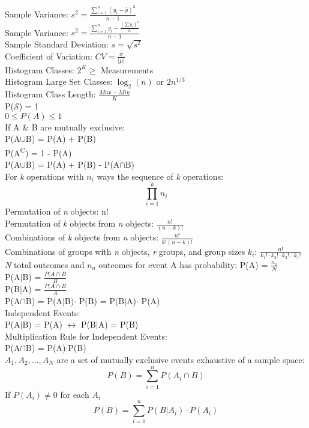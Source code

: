 \documentclass[letter, 12pt]{article}
\begin{document}
\begin{multicols}{2}
Sample Variance: $s^2=\frac{\sum_{i=1}^n (y_i-\bar{y})^2}{n-1}$\\
Sample Variance: $s^2=\frac{\sum_{i=1}^n y_i - \frac{(\sum y_i)^2}{n}}{n-1}$\\
Sample Standard Deviation: $s=\sqrt{s^2}$\\
Coefficient of Variation: $CV=\frac{\sigma}{\lvert\mu\rvert}$\\
Histogram Classes: $2^K \geq$ Measurements\\
Histogram Large Set Classes: $\log_2(n)$ or $2n^{1/3}$\\
Histogram Class Length: $\frac{Max-Min}{K}$\\
P($\mathscr{S}$) = 1\\
$0\leq P(A) \leq 1$\\
If A \& B are mutually exclusive:\\ P(A$\cup$B) = P(A) + P(B)\\ 
P(A\textsuperscript{C}) = 1 - P(A)\\
P(A$\cup$B) = P(A) + P(B) - P(A$\cap$B)\\
For \textit{k} operations with $n_i$ ways the sequence of \textit{k} operations:\\
\begin{displaymath}
\prod_{i=1}^k n_i
\end{displaymath}
Permutation of \textit{n} objects: n!\\
Permutation of \textit{k} objects from \textit{n} objects: $\frac{n!}{(n-k)!}$\\
Combinations of \textit{k} objects from \textit{n} objects: $\frac{n!}{k!(n-k)!}$\\
Combinations of groups with \textit{n} objects, \textit{r} groups, and group sizes $k_i$: $\frac{n!}{k_1!\cdot k_2! \cdot k_3! \ldots k_r!}$\\
\textit{N} total outcomes and $n_a$ outcomes for event A has probability: P(A) = $\frac{n_a}{N}$\\
P(A$\vert$B) = $\frac{P(A\cap B}{B}$\\
P(B$\vert$A) = $\frac{P(A\cap B}{A}$\\
P(A$\cap$B) = P(A$\vert$B)$\cdot$ P(B) = P(B$\vert$A)$\cdot$ P(A)\\
Independent Events:\\ P(A$\vert$B) = P(A) $\leftrightarrow$ P(B$\vert$A) = P(B)\\
Multiplication Rule for Independent Events:\\ P(A$\cap$B) = P(A)$\cdot$P(B)\\
$A_1,A_2,\ldots,A_N$ are a set of mutually exclusive events exhaustive of a sample space:\\
\begin{displaymath}
P(B) = \sum_{i=1}^n P(A_i\cap B)
\end{displaymath}
If $P(A_i) \neq 0$ for each $A_i$
\begin{displaymath}
P(B) = \sum_{i=1}^nP(B\vert A_i)\cdot P(A_i)
\end{displaymath}
\end{multicols}
\end{document}
